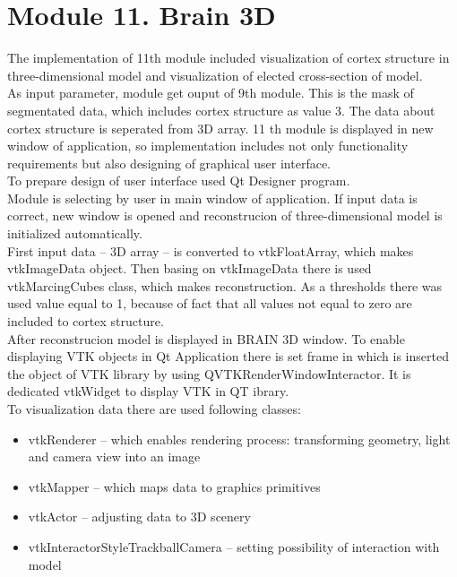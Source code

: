 \section{Module 11. Brain 3D}

\indent The implementation of 11th module included visualization of cortex structure in three-dimensional model and visualization of elected cross-section of model. \\
\indent  As input parameter, module get ouput of 9th module. This is the mask of segmentated data, which includes cortex structure as value 3. The data about cortex structure is seperated from 3D array.
11 th module is displayed in new window of application, so implementation includes not only functionality requirements but also designing of graphical user interface.  \\
\indent To prepare design of user interface used Qt Designer program. \\
\indent Module is selecting by user in main window of application. If input data is correct, new window is opened and reconstrucion of three-dimensional model is initialized automatically. \\
\indent First input data – 3D array – is converted to vtkFloatArray, which makes vtkImageData object. Then basing on vtkImageData there is used vtkMarcingCubes class, which makes reconstruction. As a thresholds there was used value equal to 1, because of fact that all values not equal to zero are included to cortex structure. \\
\indent After reconstrucion model is displayed in BRAIN 3D window. To enable displaying VTK objects in Qt Application there is set frame in which is inserted the object of VTK library by using QVTKRenderWindowInteractor. It is dedicated vtkWidget to display VTK in QT ibrary.\\
\indent To visualization data there are used following classes:

\begin{itemize}
\item vtkRenderer – which enables rendering process: transforming geometry, light and camera view into an image
\item 
vtkMapper – which maps data to graphics primitives
\item vtkActor – adjusting data to 3D scenery
\item vtkInteractorStyleTrackballCamera – setting possibility of interaction with model
\end{itemize}


